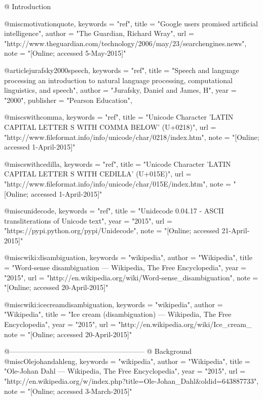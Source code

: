 @ Introduction


@misc{motivationquote,
    keywords    =   "ref",
    title       =   "Google users promised artificial intelligence",
    author      =   "The Guardian, Richard Wray", 
    url         =   "http://www.theguardian.com/technology/2006/may/23/searchengines.news",
    note        =   "[Online; accessed 5-May-2015]" 
}
 
@article{jurafsky2000speech,
    keywords    =   "ref",
    title       =   "Speech and language processing an introduction to natural language processing, computational linguistics, and speech",
    author      =   "Jurafsky, Daniel and James, H",
    year        =   "2000",
    publisher   =   "Pearson Education",
}

@misc{swithcomma,
    keywords    =   "ref",
    title       =   "Unicode Character 'LATIN CAPITAL LETTER S WITH COMMA BELOW' (U+0218)",
    url         =   "http://www.fileformat.info/info/unicode/char/0218/index.htm",
    note        =   "[Online; accessed 1-April-2015]" 
}
 
@misc{swithcedilla,
    keywords    =   "ref",
    title       =   "Unicode Character 'LATIN CAPITAL LETTER S WITH CEDILLA' (U+015E)",
    url         =   "http://www.fileformat.info/info/unicode/char/015E/index.htm",
    note        =   "[Online; accessed 1-April-2015]" 
}

@misc{unidecode,
    keywords    =   "ref",
    title       =   "Unidecode 0.04.17 - ASCII transliterations of Unicode text",
    year        =   "2015",
    url         =   "https://pypi.python.org/pypi/Unidecode",
    note        =   "[Online; accessed 21-April-2015]"
}

@misc{wiki:disambiguation,
    keywords    =   "wikipedia",
    author      =   "Wikipedia",
    title       =   "Word-sense disambiguation --- Wikipedia{,} The Free Encyclopedia",
    year        =   "2015",
    url         =   "http://en.wikipedia.org/wiki/Word-sense_disambiguation",
    note        =   "[Online; accessed 20-April-2015]"
}

@misc{wiki:icecreamdisambiguation,
    keywords    =   "wikipedia",
    author      =   "Wikipedia",
    title       =   "Ice cream (disambiguation) --- Wikipedia{,} The Free Encyclopedia",
    year        =   "2015",
    url         =   "http://en.wikipedia.org/wiki/Ice_cream_%
    note        =   "[Online; accessed 20-April-2015]"
}




@---------------------------------------------------------
@ Background
@misc{Olejohandahleng,
    keywords    =   "wikipedia",
    author      =   "Wikipedia",
    title       =   "Ole-Johan Dahl --- Wikipedia{,} The Free Encyclopedia",
    year        =   "2015",
    url         =   "http://en.wikipedia.org/w/index.php?title=Ole-Johan_Dahl&oldid=643887733",
    note        =   "[Online; accessed 3-March-2015]"
}


